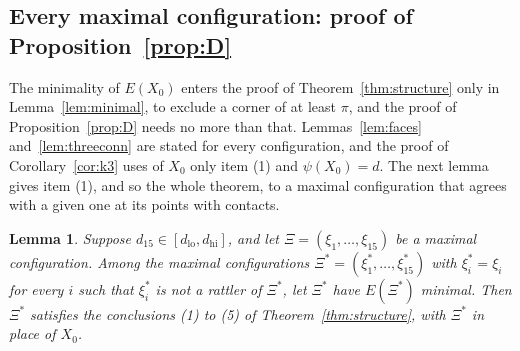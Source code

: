 \documentclass[12pt]{amsart}
\newtheorem{lemma}[theorem]{Lemma}
\theoremstyle{definition}
\theoremstyle{plain}
\theoremstyle{definition}
\newcommand{\dlo}{d_{\mathrm{lo}}}
\newcommand{\dhi}{d_{\mathrm{hi}}}
\newcommand{\leanmap}[1]{\ignorespaces}
\newcommand{\mapnote}[1]{\ignorespaces}
\begin{document}
\subsection{Every maximal configuration: proof of Proposition~\ref{prop:D}}\label{sec:allmax}
The minimality of $E(X_0)$ enters the proof of Theorem~\ref{thm:structure} only in Lemma~\ref{lem:minimal}, to exclude a corner of at least $\pi$, and the proof of Proposition~\ref{prop:D} needs no more than that. Lemmas~\ref{lem:faces} and~\ref{lem:threeconn} are stated for every configuration, and the proof of Corollary~\ref{cor:k3} uses of $X_0$ only item (1) and $\psi(X_0)=d$. The next lemma gives item (1), and so the whole theorem, to a maximal configuration that agrees with a given one at its points with contacts.

\begin{lemma}\label{lem:descent}\leanmap{Tammes15.exists_unshiftable, Tammes15.lemma_unshiftable, Tammes15.structured_of_unshiftable, Tammes15.Unshiftable, Tammes15.Descends}\mapnote{the minimality is replaced by the property it gives: no point of $\Xi^*$ with a contact can be moved to a point at distance more than $d$ from all the others while the others stay (fourth declaration); the first declaration gives a $\Xi^*$ at pairwise distance at least $d$, for every $d$, with this property and agreeing with $\Xi$ at its points with contacts (fifth declaration); the second is Lemma \ref{lem:minimal} for such a $\Xi^*$, for every $d\in(0,\pi/2)$, and the third items (1) to (4) of Theorem \ref{thm:structure} for such a $\Xi^*$, for every $d$ in an interval $[a,b]\subseteq[d_{lo},d_{hi}]$ with $7a>2\pi$ and $\alpha(b)<2\pi/5$ and $\Xi^*$ with a contact}
Suppose $d_{15}\in[\dlo,\dhi]$, and let $\Xi=(\xi_1,\dots,\xi_{15})$ be a maximal configuration. Among the maximal configurations $\Xi^*=(\xi^*_1,\dots,\xi^*_{15})$ with $\xi^*_i=\xi_i$ for every $i$ such that $\xi^*_i$ is not a rattler of $\Xi^*$, let $\Xi^*$ have $E(\Xi^*)$ minimal. Then $\Xi^*$ satisfies the conclusions (1) to (5) of Theorem~\ref{thm:structure}, with $\Xi^*$ in place of $X_0$.
\end{lemma}
\end{document}
